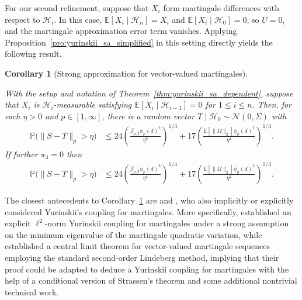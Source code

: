 \documentclass[11pt,lof]{puthesis}
\renewcommand{\P}{\ensuremath{\mathbb{P}}}
\newcommand{\E}{\ensuremath{\mathbb{E}}}
\newcommand{\cH}{\ensuremath{\mathcal{H}}}
\newcommand{\cN}{\ensuremath{\mathcal{N}}}
\theoremstyle{break}
\newtheorem{corollary}{Corollary}[section]
\theoremstyle{proof}
\begin{document}
For our second refinement, suppose that
$X_i$ form martingale differences with respect to $\cH_i$.
In this case, $\E[X_i \mid \cH_n] = X_i$ and $\E[X_i \mid \cH_0] = 0$,
so $U = 0$, and the martingale approximation error term vanishes.
Applying Proposition~\ref{pro:yurinskii_sa_simplified} in this setting
directly yields the following result.
%
\begin{corollary}[Strong approximation for vector-valued martingales]%
\label{cor:yurinskii_sa_martingale}

With the setup and notation of Theorem~\ref{thm:yurinskii_sa_dependent},
suppose that
$X_i$ is $\cH_i$-measurable satisfying $\E[X_i \mid \cH_{i-1}] = 0$ for
$1 \leq i \leq n$. Then, for each $\eta > 0$ and $p \in [1,\infty]$, there is
a random vector $T \mid \cH_0 \sim \cN(0, \Sigma)$ with
%
\begin{align}
\label{eq:yurinskii_sa_martingale_order_2}
\P\big(\|S-T\|_p > \eta\big)
&\leq
24 \left(
\frac{\beta_{p,2} \phi_p(d)^2}{\eta^3}
\right)^{1/3}
+ 17 \left(
\frac{\E \left[ \|\Omega\|_2 \right] \phi_p(d)^2}{\eta^2}
\right)^{1/3}.
\end{align}
%
If further $\pi_3 = 0$ then
%
\begin{align}
\label{eq:yurinskii_sa_martingale_order_3}
\P\big(\|S-T\|_p > \eta\big)
&\leq
24 \left(
\frac{\beta_{p,3} \phi_p(d)^3}{\eta^4}
\right)^{1/4}
+ 17 \left(
\frac{\E \left[ \|\Omega\|_2 \right] \phi_p(d)^2}{\eta^2}
\right)^{1/3}.
\end{align}
%
\end{corollary}

The closest antecedents to Corollary~\ref{cor:yurinskii_sa_martingale} are
\citet{belloni2018high} and \citet{li2020uniform}, who also implicitly or
explicitly considered Yurinskii's coupling for martingales. More specifically,
\citet[Theorem~1]{li2020uniform} established an explicit
$\ell^2$-norm Yurinskii coupling
for martingales under a strong assumption on the minimum eigenvalue of the
martingale quadratic variation, while \citet[Theorem~2.1]{belloni2018high}
established a central limit theorem for vector-valued martingale sequences
employing the standard second-order Lindeberg method, implying that their proof
could be adapted to deduce a Yurinskii coupling for martingales with the help
of a conditional version of Strassen's theorem \citep{chen2020jackknife} and
some additional nontrivial technical work.
\end{document}
